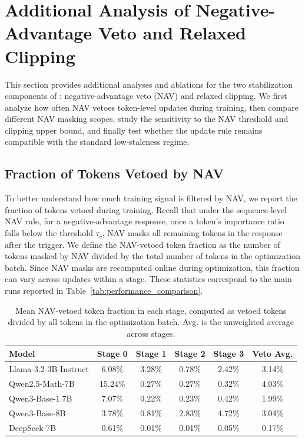 

\section{Additional Analysis of Negative-Advantage Veto and Relaxed Clipping}
\label{app:nav_relaxed_clipping}

This section provides additional analyses and ablations for the two stabilization
components of \ourmethod{}: negative-advantage veto (NAV) and relaxed clipping.
We first analyze how often NAV vetoes token-level updates during training, then
compare different NAV masking scopes, study the sensitivity to the NAV threshold
and clipping upper bound, and finally test whether the \ourmethod{} update rule
remains compatible with the standard low-staleness regime.

\subsection{Fraction of Tokens Vetoed by NAV}
\label{app:veto_fraction}

To better understand how much training signal is filtered by NAV, we report the fraction of tokens vetoed during \ourmethod{} training. Recall that under the sequence-level NAV rule, for a negative-advantage response, once a token's importance ratio falls below the threshold $\tau_c$, NAV masks all remaining tokens in the response after the trigger. We define the NAV-vetoed token fraction as the number of tokens masked by NAV divided by the total number of tokens in the optimization batch. Since NAV masks are recomputed online during optimization, this fraction can vary across updates within a stage. These statistics correspond to the main \ourmethod{} runs reported in Table~\ref{tab:performance_comparison}.

\begin{table}[!h]
\vspace{-8pt}
\centering
\caption{Mean NAV-vetoed token fraction in each stage, computed as vetoed tokens
divided by all tokens in the optimization batch. Avg. is the unweighted average
across stages.}
\label{tab:veto_fraction}
\begin{tabular}{lccccc}
\toprule
Model & Stage 0 & Stage 1 & Stage 2 & Stage 3 & Veto Avg. \\
\midrule
Llama-3.2-3B-Instruct & 6.08\% & 3.28\% & 0.78\% & 2.42\% & 3.14\% \\
Qwen2.5-Math-7B & 15.24\% & 0.27\% & 0.27\% & 0.32\% & 4.03\% \\
Qwen3-Base-1.7B & 7.07\% & 0.22\% & 0.23\% & 0.42\% & 1.99\% \\
Qwen3-Base-8B & 3.78\% & 0.81\% & 2.83\% & 4.72\% & 3.04\% \\
DeepSeek-7B & 0.61\% & 0.01\% & 0.01\% & 0.05\% & 0.17\% \\
\bottomrule
\end{tabular}
\vspace{-1pt}
\end{table}

